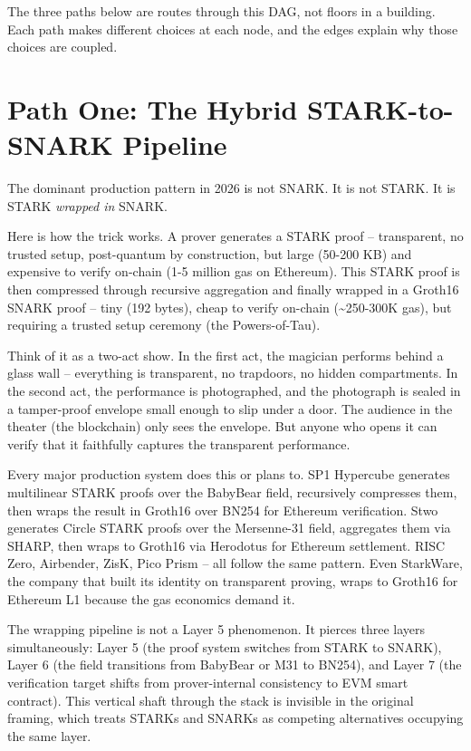\documentclass[
  11pt,
  openany]{report}
\begin{document}
The three paths below are routes through this DAG, not floors in a building.
Each path makes different choices at each node, and the edges explain why those
choices are coupled.

\section{Path One: The Hybrid STARK-to-SNARK
Pipeline}\label{path-one-the-hybrid-stark-to-snark-pipeline}

The dominant production pattern in 2026 is not SNARK. It is not STARK. It is
STARK \emph{wrapped in} SNARK.

Here is how the trick works. A prover generates a STARK proof -- transparent, no
trusted setup, post-quantum by construction, but large (50-200 KB) and expensive
to verify on-chain (1-5 million gas on Ethereum). This STARK proof is then
compressed through recursive aggregation and finally wrapped in a Groth16 SNARK
proof -- tiny (192 bytes), cheap to verify on-chain (\textasciitilde250-300K
gas), but requiring a trusted setup ceremony (the Powers-of-Tau).

Think of it as a two-act show. In the first act, the magician performs behind a
glass wall -- everything is transparent, no trapdoors, no hidden compartments.
In the second act, the performance is photographed, and the photograph is sealed
in a tamper-proof envelope small enough to slip under a door. The audience in
the theater (the blockchain) only sees the envelope. But anyone who opens it can
verify that it faithfully captures the transparent performance.

Every major production system does this or plans to. SP1 Hypercube generates
multilinear STARK proofs over the BabyBear field, recursively compresses them,
then wraps the result in Groth16 over BN254 for Ethereum verification. Stwo
generates Circle STARK proofs over the Mersenne-31 field, aggregates them via
SHARP, then wraps to Groth16 via Herodotus for Ethereum settlement. RISC Zero,
Airbender, ZisK, Pico Prism -- all follow the same pattern. Even StarkWare, the
company that built its identity on transparent proving, wraps to Groth16 for
Ethereum L1 because the gas economics demand it.

The wrapping pipeline is not a Layer 5 phenomenon. It pierces three layers
simultaneously: Layer 5 (the proof system switches from STARK to SNARK), Layer 6
(the field transitions from BabyBear or M31 to BN254), and Layer 7 (the
verification target shifts from prover-internal consistency to EVM smart
contract). This vertical shaft through the stack is invisible in the original
framing, which treats STARKs and SNARKs as competing alternatives occupying the
same layer.
\end{document}
